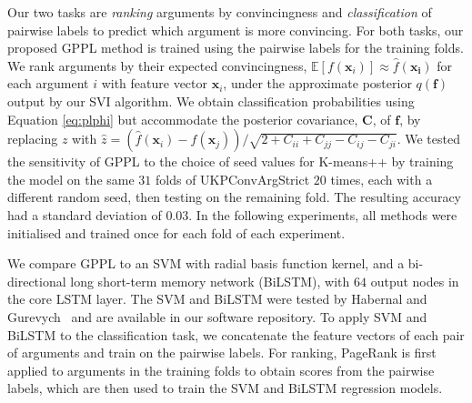 Our two tasks are \emph{ranking} arguments by convincingness and  
\emph{classification} of pairwise labels to predict which argument is more convincing. 
For both tasks, our proposed GPPL method is trained using the pairwise labels for the training folds.
We rank arguments by their expected convincingness, $\mathbb{E}[f(\mathbf{x}_i)]\approx \hat{f}(\mathbf {x_i})$ for each argument $i$ with feature vector $\mathbf{x}_i$, under the approximate posterior $q(\mathbf f)$
output by our SVI algorithm.
We obtain classification probabilities using Equation \ref{eq:plphi} but 
accommodate the posterior covariance, $\mathbf C$, of $\mathbf f$, by replacing $z$ with $\hat{z} = (\hat{f}(\mathbf x_i) - \hat{f}(\mathbf x_j)) / \sqrt{2 + C_{ii} + C_{jj} - C_{ij} - C_{ji}}$.
We tested the sensitivity of GPPL to the choice of seed values for K-means++ by training the model on the same $31$ folds of UKPConvArgStrict $20$ times, each with a different random seed, then testing on the remaining fold.
The resulting accuracy had a standard deviation of $0.03$. 
In the following experiments, all methods were initialised and trained once for each fold of each experiment.

We compare GPPL to an SVM with radial basis function kernel, 
and a bi-directional long short-term memory network (BiLSTM),
with $64$ output nodes in the core LSTM layer. 
The SVM and BiLSTM were tested by Habernal and Gurevych~ and are available in our software repository.
To apply SVM and BiLSTM to the classification task, we concatenate the feature vectors of each pair of arguments and train on the pairwise labels.
For ranking, PageRank is first applied to arguments in the training folds to obtain scores from the pairwise labels,
which are then used to train the SVM and BiLSTM regression models.



